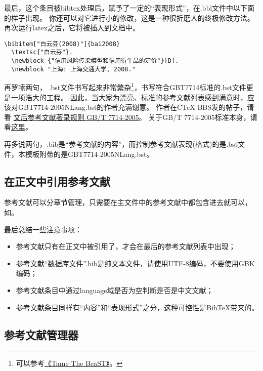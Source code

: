 最后，这个条目被bibtex处理后，赋予了一定的``表现形式''，在.bbl文件中以下面的样子出现。
你还可以对它进行小的修改，这是一种很折磨人的终极修改方法。
再次运行latex之后，它将被插入到文档中。

\begin{lstlisting}[caption={.bbl中被格式化之后的条目}, escapeinside="", numbers=none]
\bibitem["白云芬(2008)"]{bai2008}
  \textsc{"白云芬"}.
  \newblock {"信用风险传染模型和信用衍生品的定价"}[D].
  \newblock "上海: 上海交通大学, 2008."
\end{lstlisting}

再罗嗦两句，
.bst文件书写起来非常繁杂\footnote{可以参考\href{http://ftp.ctex.org/mirrors/CTAN/info/bibtex/tamethebeast/ttb_en.pdf}{《Tame The BeaST》}。}，书写符合GBT7714标准的.bst文件更是一项浩大的工程。
因此，当大家为漂亮、标准的参考文献列表感到满意时，应该对GBT7714-2005NLang.bst的作者充满谢意。
作者在CTeX BBS发的帖子，请看
\href{http://bbs.ctex.org/viewthread.php?tid=33571&highlight=\%B2\%CE\%BF\%BC\%CE\%C4\%CF\%D7\%2BGB}{文后参考文献著录规则 GB/T 7714-2005}。
关于GB/T 7714-2005标准本身，请看\href{http://bbs.ctex.org/viewthread.php?tid=33571&highlight=GB\%2B\%B2\%CE\%BF\%BC\%CE\%C4\%CF\%D7}{这里}。

再多说两句，.bib是“参考文献的内容”，而控制参考文献表现(格式)的是.bst文件，本模板附带的是GBT7714-2005NLang.bst。

\subsection{在正文中引用参考文献}

参考文献可以分章节管理，只需要在主文件中的参考文献中都包含进去就可以，如\verb++。

最后总结一些注意事项：
\begin{itemize}
\item 参考文献只有在正文中被引用了，才会在最后的参考文献列表中出现；
\item 参考文献``数据库文件''.bib是纯文本文件，请使用UTF-8编码，不要使用GBK编码；
\item 参考文献条目中通过language域是否为空判断是否是中文文献；
\item 参考文献条目同样有“内容”和“表现形式”之分，这种可控性是BibTeX带来的。
\end{itemize}


\subsection{参考文献管理器}

